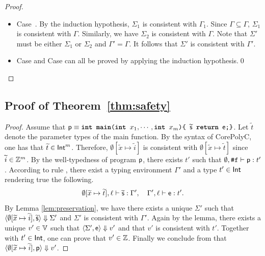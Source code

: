 \documentclass[runningheads]{llncs}
\begin{document}
\begin{proof}
\begin{itemize}
    \item Case~.
    By the induction hypothesis, $\Sigma_1$ is consistent with $\Gamma_1$.
    Since $\Gamma\subseteq\Gamma$, $\Sigma_1$ is consistent with $\Gamma$.
    Similarly, we have $\Sigma_2$ is consistent with $\Gamma$.
    Note that $\Sigma'$ must be either $\Sigma_1$ or $\Sigma_2$ and $\Gamma'=\Gamma$.
    It follows that $\Sigma'$ is consistent with $\Gamma'$.
    \item Case  and Case  can all be proved by applying the induction hypothesis.\qed
\end{itemize}
\end{proof}

\subsection{Proof of Theorem~\ref{thm:safety}}
\begin{proof}
Assume that $\mathsf{p}\equiv\texttt{\textbf{int main}(\textbf{int} } x_1,\cdots,\texttt{\textbf{int} }x_m \texttt{)\{ }\widetilde{\mathsf{s}}\texttt{ \textbf{return} }\mathsf{e}\texttt{;\}}$.
Let $\widetilde{t}$ denote the parameter types of the main function. By the syntax of CorePolyC, one has that $\widetilde{t}\in\mathsf{Int}^m$.
Therefore, $\emptyset[\widetilde{x}\mapsto\widetilde{i}]$ is consistent with $\emptyset[\widetilde{x}\mapsto\widetilde{t}]$ since $\widetilde{i}\in\mathbb{Z}^m$.
By the well-typedness of program $\mathsf{p}$, there exists $t'$ such that $\emptyset,\texttt{\#}\mathtt{f}\vdash\mathsf{p}:t'$.
According to rule , there exist a typing environment $\Gamma'$ and a type $t'\in\mathsf{Int}$ rendering true the following.
\begin{equation}
    \emptyset[\widetilde{x}\mapsto\widetilde{t}],\ell\vdash\widetilde{\mathsf{s}}:\Gamma',\quad\Gamma',\ell\vdash\mathsf{e}:t'.
\end{equation}
By Lemma \ref{lem:preservation}, we have there exists a unique $\Sigma'$ such that $\langle\emptyset[\widetilde{x}\mapsto{\widetilde{i}}],\widetilde{\mathsf{s}}\rangle\Downarrow{\Sigma'}$ and $\Sigma'$ is consistent with $\Gamma'$.
Again by the lemma, there exists a unique $v'\in\mathbb{V}$ such that $\langle\Sigma',\mathsf{e}\rangle\Downarrow{v'}$ and that $v'$ is consistent with $t'$.
Together with $t'\in\mathsf{Int}$, one can prove that $v'\in\mathbb{Z}$.
Finally we conclude from  that $\langle\emptyset[\widetilde{x}\mapsto{\widetilde{i}}],\mathsf{p}\rangle\Downarrow{v'}$.
\end{proof}
\end{document}
